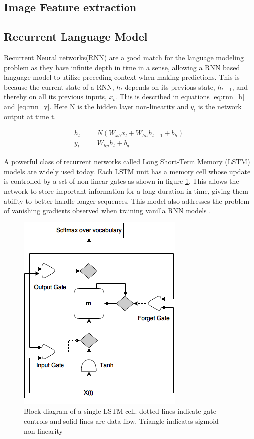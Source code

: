 
\subsection{Image Feature extraction}


\subsection{Recurrent Language Model}
Recurrent Neural networks(RNN) are a good match for the language modeling
problem as they have infinite depth in time in a sense, allowing a RNN based
language model to utilize preceding context when making predictions. This is
because the current state of a RNN, $h_t$ depends on its previous state,
$h_{t-1}$, and thereby on all its previous inputs, $x_t$. This is described in
equations \ref{eq:rnn_h} and \ref{eq:rnn_y}. Here N is the hidden layer
non-linearity and $y_t$ is the network output at time t.

\begin{eqnarray}
    \label{eq:rnn_h} h_t &=& N(W_{xh}x_t+W_{hh}h_{t-1}+b_h)\\
    \label{eq:rnn_y} y_t &=& W_{hy}h_t + b_y
\end{eqnarray} 

A powerful class of recurrent networks called Long Short-Term Memory
(LSTM) models \cite{Hochreiter:1997:LSM:1246443.1246450} are widely used today.
Each LSTM unit has a memory cell whose update is controlled by a set of
non-linear gates as shown in figure \ref{fig:lstmcell}. This allows the network
to store important information for a long duration in time, giving them ability
to better handle longer sequences. This model also addresses the problem of
vanishing gradients observed when training vanilla RNN models
\cite{Bengio93Vanishing}\cite{pascanu2012difficulty}.

\begin{figure}[h]
	\begin{center}
		\includegraphics[width=0.5\linewidth]{images/LstmCell.png}
	\end{center}
	\caption{Block diagram of a single LSTM cell. dotted lines indicate
		gate controls and solid lines are data flow. Triangle indicates
		sigmoid non-linearity.}
	\label{fig:lstmcell}
\end{figure}

